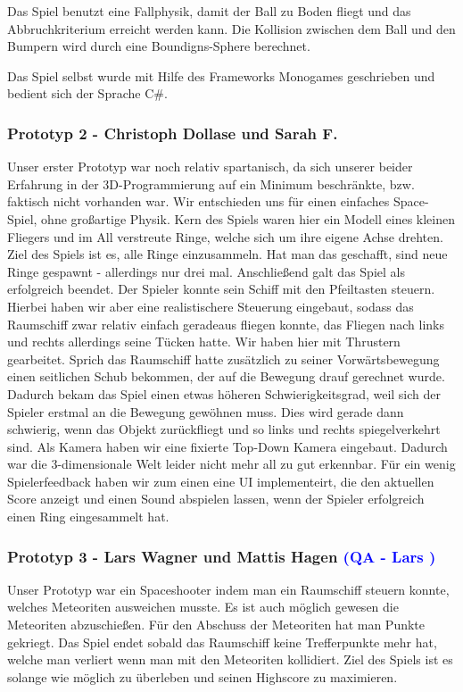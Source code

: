 \documentclass[12pt]{article}
\begin{document}
Das Spiel benutzt eine Fallphysik, damit der Ball zu Boden fliegt und das Abbruchkriterium erreicht werden kann. Die Kollision
zwischen dem Ball und den Bumpern wird durch eine Boundigns-Sphere berechnet.

Das Spiel selbst wurde mit Hilfe des Frameworks Monogames geschrieben und bedient sich der Sprache C\#.

\vspace{1cm}
\subsubsection{Prototyp 2 - Christoph Dollase und Sarah F.}
Unser erster Prototyp war noch relativ spartanisch, da sich unserer beider Erfahrung in der 3D-Programmierung auf ein Minimum beschränkte, bzw. faktisch nicht vorhanden war. Wir entschieden uns für einen einfaches Space-Spiel, ohne großartige Physik. Kern des Spiels waren hier ein Modell eines kleinen Fliegers und im All verstreute Ringe, welche sich um ihre eigene Achse drehten. Ziel des Spiels ist es, alle Ringe einzusammeln. Hat man das geschafft, sind neue Ringe gespawnt - allerdings nur drei mal. Anschließend galt das Spiel als erfolgreich beendet. \newline
Der Spieler konnte sein Schiff mit den Pfeiltasten steuern. Hierbei haben wir aber eine realistischere Steuerung eingebaut, sodass das Raumschiff zwar relativ einfach geradeaus fliegen konnte, das Fliegen nach links und rechts allerdings seine Tücken hatte. Wir haben hier mit \glqq Thrustern\grqq{} gearbeitet. Sprich das Raumschiff hatte zusätzlich zu seiner Vorwärtsbewegung einen seitlichen Schub bekommen, der auf die Bewegung drauf gerechnet wurde. Dadurch bekam das Spiel einen etwas höheren Schwierigkeitsgrad, weil sich der Spieler erstmal an die Bewegung gewöhnen muss. Dies wird gerade dann schwierig, wenn das Objekt zurückfliegt und so links und rechts spiegelverkehrt sind.
Als Kamera haben wir eine fixierte Top-Down Kamera eingebaut.
Dadurch war die 3-dimensionale Welt leider nicht mehr all zu gut erkennbar.
Für ein wenig Spielerfeedback haben wir zum einen eine UI implementeirt, die den aktuellen Score anzeigt und einen Sound abspielen lassen, wenn der Spieler erfolgreich einen Ring eingesammelt hat.

\vspace{1cm}
\subsubsection{Prototyp 3 - Lars Wagner und Mattis Hagen \textcolor{blue}{(QA - Lars )}}
Unser Prototyp war ein Spaceshooter indem man ein Raumschiff steuern konnte, welches Meteoriten ausweichen musste.
Es ist auch möglich gewesen die Meteoriten abzuschießen. Für den Abschuss der Meteoriten hat man Punkte gekriegt. Das Spiel endet
sobald das Raumschiff keine Trefferpunkte mehr hat, welche man verliert wenn man mit den Meteoriten kollidiert. Ziel des Spiels ist es
solange wie möglich zu überleben und seinen Highscore zu maximieren.
\end{document}
